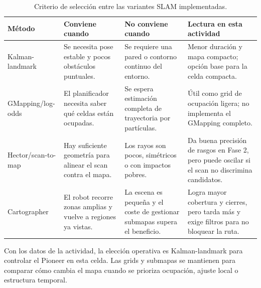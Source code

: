 \begin{table}[H]
\centering
\small
\setlength{\tabcolsep}{3pt}
\begin{tabularx}{\textwidth}{@{}P{0.20\textwidth}P{0.28\textwidth}P{0.25\textwidth}Y@{}}
\toprule
\textbf{Método} & \textbf{Conviene cuando} & \textbf{No conviene cuando} & \textbf{Lectura en esta actividad}\\
\midrule
Kalman-landmark & Se necesita pose estable y pocos obstáculos puntuales. & Se requiere una pared o contorno continuo del entorno. & Menor duración y mapa compacto; opción base para la celda compacta.\\
GMapping/log-odds & El planificador necesita saber qué celdas están ocupadas. & Se espera estimación completa de trayectoria por partículas. & Útil como grid de ocupación ligera; no implementa el GMapping completo.\\
Hector/scan-to-map & Hay suficiente geometría para alinear el scan contra el mapa. & Los rayos son pocos, simétricos o con impactos pobres. & Da buena precisión de rasgos en Fase 2, pero puede oscilar si el scan no discrimina candidatos.\\
Cartographer & El robot recorre zonas amplias y vuelve a regiones ya vistas. & La escena es pequeña y el coste de gestionar submapas supera el beneficio. & Logra mayor cobertura y cierres, pero tarda más y exige filtros para no bloquear la ruta.\\
\bottomrule
\end{tabularx}
\caption{Criterio de selección entre las variantes SLAM implementadas.}
\label{tab:slam-selection}
\end{table}

Con los datos de la actividad, la elección operativa es Kalman-landmark para
controlar el Pioneer en esta celda. Las grids y submapas se mantienen para
comparar cómo cambia el mapa cuando se prioriza ocupación, ajuste local o
estructura temporal.

